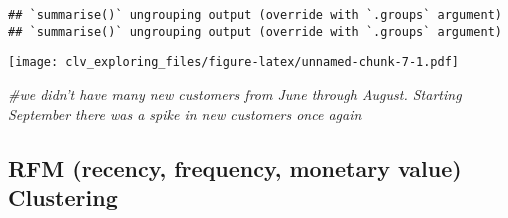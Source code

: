 \documentclass[]{article}
\newenvironment{Shaded}{\begin{snugshade}}{\end{snugshade}}
\newcommand{\CommentTok}[1]{\textcolor[rgb]{0.56,0.35,0.01}{\textit{#1}}}
\newcommand{\DataTypeTok}[1]{\textcolor[rgb]{0.13,0.29,0.53}{#1}}
\newcommand{\KeywordTok}[1]{\textcolor[rgb]{0.13,0.29,0.53}{\textbf{#1}}}
\newcommand{\NormalTok}[1]{#1}
\newcommand{\OperatorTok}[1]{\textcolor[rgb]{0.81,0.36,0.00}{\textbf{#1}}}
\newcommand{\StringTok}[1]{\textcolor[rgb]{0.31,0.60,0.02}{#1}}
\begin{document}
\begin{Shaded}
\end{Shaded}

\begin{verbatim}
## `summarise()` ungrouping output (override with `.groups` argument)
## `summarise()` ungrouping output (override with `.groups` argument)
\end{verbatim}

\texttt{[image: clv\_exploring\_files/figure-latex/unnamed-chunk-7-1.pdf]}

\begin{Shaded}
\begin{Highlighting}[]
\CommentTok{#we didn't have many new customers from June through August. Starting September there was a spike in new customers once again}
\end{Highlighting}
\end{Shaded}

\hypertarget{rfm-recency-frequency-monetary-value-clustering}{%
\subsection{RFM (recency, frequency, monetary value)
Clustering}\label{rfm-recency-frequency-monetary-value-clustering}}
\end{document}
